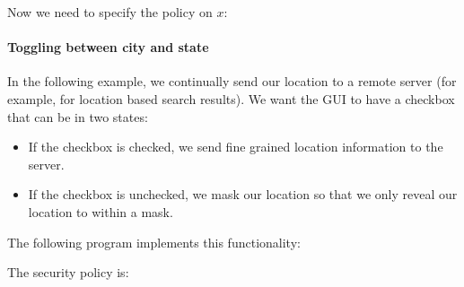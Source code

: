 

Now we need to specify the policy on $x$:



\paragraph{Toggling between city and state}

In the following example, we continually send our location to a remote
server (for example, for location based search results).  We want the
GUI to have a checkbox that can be in two states:

\begin{itemize}
\item If the checkbox is checked, we send fine grained location
  information to the server.
\item If the checkbox is unchecked, we mask our location so that we
  only reveal our location to within a mask.
\end{itemize}

The following program implements this functionality:



The security policy is:


